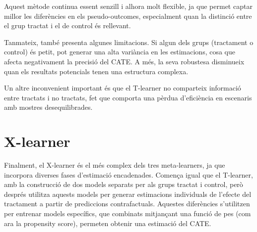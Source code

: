 \documentclass[../main.tex]{subfiles}
\begin{document}
    Aquest mètode continua essent senzill i alhora molt flexible, ja que permet captar millor les diferències en els pseudo-outcomes, especialment quan la distinció entre el grup tractat i el de control és rellevant.\par
    Tanmateix, també presenta algunes limitacions. Si algun dels grups (tractament o control) és petit, pot generar una alta variància en les estimacions, cosa que afecta negativament la precisió del CATE. A més, la seva robustesa disminueix quan els resultats potencials tenen una estructura complexa.\par
    Un altre inconvenient important és que el T-learner no comparteix informació entre tractats i no tractats, fet que comporta una pèrdua d’eficiència en escenaris amb mostres desequilibrades.


    \section{X-learner} \label{sec:xlearner}
    Finalment, el X-learner és el més complex dels tres meta-learners, ja que incorpora diverses fases d’estimació encadenades. Comença igual que el T-learner, amb la construcció de dos models separats per als grups tractat i control, però després utilitza aquests models per generar estimacions individuals de l’efecte del tractament a partir de prediccions contrafactuals. Aquestes diferències s’utilitzen per entrenar models específics, que combinats mitjançant una funció de pes (com ara la propensity score), permeten obtenir una estimació del CATE.
    
\end{document}
